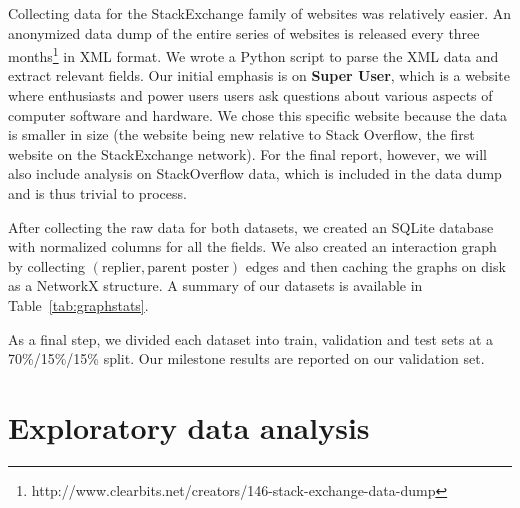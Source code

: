 \documentclass[10pt]{article}
\begin{document}
Collecting data for the StackExchange family of websites was relatively easier.
An anonymized data dump of the entire series of websites is released every three
months\footnote{http://www.clearbits.net/creators/146-stack-exchange-data-dump}
in XML format. We wrote a Python script to parse the XML data and extract
relevant fields. Our initial emphasis is on \textbf{Super User}, which is a website where
enthusiasts and power users users ask questions about various aspects of
computer software and hardware. We chose this specific website because the data
is smaller in size (the website being new relative to Stack Overflow, the first
website on the StackExchange network). For the final report, however, we will
also include analysis on StackOverflow data, which is included in the data dump
and is thus trivial to process.

After collecting the raw data for both datasets, we created an SQLite database
with normalized columns for all the fields. We also created an interaction graph
by collecting $(\text{replier}, \text{parent poster})$ edges and then caching
the graphs on disk as a NetworkX structure. A summary of our datasets is
available in Table~\ref{tab:graphstats}.

As a final step, we divided each dataset into train, validation and test sets at
a 70\%/15\%/15\% split. Our milestone results are reported on our validation
set.

\section{Exploratory data analysis}
\end{document}
